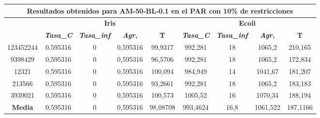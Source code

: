 \documentclass[12pt, spanish]{article}
\begin{document}
\begin{table}[H]
\footnotesize
\begin{tabular}{|c|c|c|c|c|c|c|c|c|}
\hline
\multicolumn{9}{|c|}{\textbf{Resultados obtenidos para AM-50-BL-0.1 en el PAR con 10\% de restricciones}}                                                                                                         \\ \hline
\multirow{2}{*}{} & \multicolumn{4}{c|}{\textbf{Iris}}                                                            & \multicolumn{4}{c|}{\textbf{Ecoli}}                                                           \\ \cline{2-9} 
                  & \textit{\textbf{Tasa\_C}} & \textit{\textbf{Tasa\_inf}} & \textit{\textbf{Agr,}} & \textbf{T} & \textit{\textbf{Tasa\_C}} & \textit{\textbf{Tasa\_inf}} & \textit{\textbf{Agr,}} & \textbf{T} \\ \hline
123452244         & 0,595316                  & 0                           & 0,595316               & 99,9317    & 992,281                   & 18                          & 1065,2                 & 210,165    \\ \hline
9398429           & 0,595316                  & 0                           & 0,595316               & 96,5706    & 992,281                   & 18                          & 1065,2                 & 172,834    \\ \hline
12321             & 0,595316                  & 0                           & 0,595316               & 100,094    & 984,949                   & 14                          & 1041,67                & 181,207    \\ \hline
213566            & 0,595316                  & 0                           & 0,595316               & 93,2661    & 992,281                   & 18                          & 1065,2                 & 183,183    \\ \hline
3939021           & 0,595316                  & 0                           & 0,595316               & 100,573    & 1005,52                   & 16                          & 1070,34                & 188,194    \\ \hline
\textbf{Media}    & 0,595316                  & 0                           & 0,595316               & 98,08708   & 993,4624                  & 16,8                        & 1061,522               & 187,1166   \\ \hline
\end{tabular}
\end{table}
\end{document}
